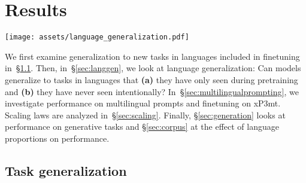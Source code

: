 \documentclass[11pt]{article}
\begin{document}
\section{Results}

\begin{figure*}[ht]
\texttt{[image: assets/language\_generalization.pdf]}
\centering
\caption{Zero-shot task and language generalization using English prompts on tasks and languages not intentionally seen during pretraining nor finetuning. Language codes are ISO 639-1, except for JP (Japanese).}
\label{fig:langgen}
\end{figure*}

We first examine generalization to new tasks in languages included in finetuning in~\S\ref{sec:taskgen}. Then, in~\S\ref{sec:langgen}, we look at language generalization: Can models generalize to tasks in languages that \textbf{(a)} they have only seen during pretraining and \textbf{(b)} they have never seen intentionally? In~\S\ref{sec:multilingualprompting}, we investigate performance on multilingual prompts and finetuning on xP3mt. Scaling laws are analyzed in~\S\ref{sec:scaling}. Finally, \S\ref{sec:generation} looks at performance on generative tasks and \S\ref{sec:corpus} at the effect of language proportions on performance.


\subsection{Task generalization}
\label{sec:taskgen}
\end{document}
